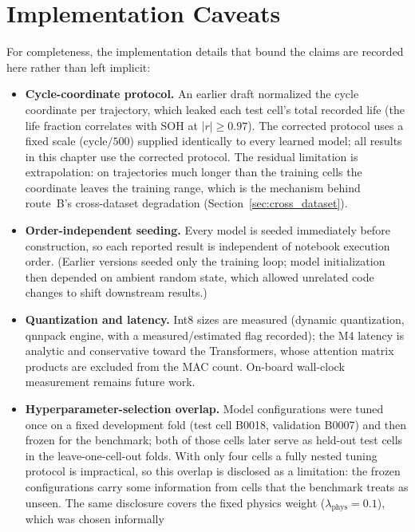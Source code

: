 \section{Implementation Caveats}
\label{sec:caveats}

For completeness, the implementation details that bound the claims are recorded
here rather than left implicit:

\begin{itemize}
    \item \textbf{Cycle-coordinate protocol.} An earlier draft normalized the
    cycle coordinate per trajectory, which leaked each test cell's total
    recorded life (the life fraction correlates with SOH at $|r|\ge0.97$). The
    corrected protocol uses a fixed scale ($\mathrm{cycle}/500$) supplied
    identically to every learned model; all results in this chapter use the
    corrected protocol. The residual limitation is extrapolation: on
    trajectories much longer than the training cells the coordinate leaves the
    training range, which is the mechanism behind route~B's cross-dataset
    degradation (Section~\ref{sec:cross_dataset}).
    \item \textbf{Order-independent seeding.} Every model is seeded immediately
    before construction, so each reported result is independent of notebook
    execution order. (Earlier versions seeded only the training loop; model
    initialization then depended on ambient random state, which allowed
    unrelated code changes to shift downstream results.)
    \item \textbf{Quantization and latency.} Int8 sizes are measured (dynamic
    quantization, qnnpack engine, with a measured/estimated flag recorded); the
    M4 latency is analytic and conservative toward the Transformers, whose
    attention matrix products are excluded from the MAC count. On-board
    wall-clock measurement remains future work.
    \item \textbf{Hyperparameter-selection overlap.} Model configurations were
    tuned once on a fixed development fold (test cell B0018, validation B0007)
    and then frozen for the benchmark; both of those cells later serve as
    held-out test cells in the leave-one-cell-out folds. With only four cells a
    fully nested tuning protocol is impractical, so this overlap is disclosed as
    a limitation: the frozen configurations carry some information from cells
    that the benchmark treats as unseen. The same disclosure covers the fixed
    physics weight ($\lambda_{\mathrm{phys}}=0.1$), which was chosen informally

\end{itemize}
